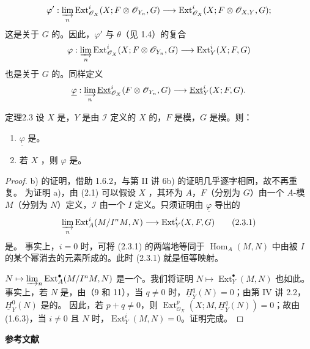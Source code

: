 \[
\varphi':\varinjlim_n\operatorname{Ext}^i_{\mathscr O_X}(X;F\otimes\mathscr O_{Y_n},G)
\longrightarrow\operatorname{Ext}^i_{\mathscr O_X}(X;F\otimes\mathscr O_{X,Y},G);
\]
这是关于 $G$ 的。因此，$\varphi'$ 与 $\theta$（见 1.4）的复合
\[
\varphi:\varinjlim_n\operatorname{Ext}^i_{\mathscr O_X}(X;F\otimes\mathscr O_{Y_n},G)
\longrightarrow\operatorname{Ext}^i_Y(X;F,G)
\]
也是关于 $G$ 的。同样定义
\[
\underline\varphi:\varinjlim_n\underline{\operatorname{Ext}}^i_{\mathscr O_X}(F\otimes\mathscr O_{Y_n},G)
\longrightarrow\underline{\operatorname{Ext}}^i_Y(X;F,G).
\]
\begin{SGAresult}{定理}{2.3}
设 $X$ 是，$Y$ 是由 $\mathscr I$ 定义的 $X$ 的，$F$ 是模，$G$ 是模。则：
\begin{enumerate}
\item[a)] $\underline\varphi$ 是。
\item[b)] 若 $X$ ，则 $\varphi$ 是。
\end{enumerate}
\end{SGAresult}
\begin{proof}
b) 的证明，借助 1.6.2，与第 II 讲 6b) 的证明几乎逐字相同，故不再重复。
为证明 a)，由 (2.1) 可以假设 $X$ ，其环为 $A$，$F$（分别为 $G$）由一个 $A$-模 $M$（分别为 $N$）定义，$\mathscr I$ 由一个 $I$ 定义。只须证明由 $\underline\varphi$ 导出的
\[
\varinjlim_n\operatorname{Ext}^i_A(M/I^nM,N)
\longrightarrow\operatorname{Ext}^i_Y(X,F,G)\tag{2.3.1}
\]
是。
事实上，$i=0$ 时，可将 (2.3.1) 的两端地等同于 $\operatorname{Hom}_A(M,N)$ 中由被 $I$ 的某个幂消去的元素所成的。此时 (2.3.1) 就是恒等映射。

 $N\mapsto\varinjlim_n\operatorname{Ext}^{\bullet}_A(M/I^nM,N)$ 是一个。我们将证明 $N\mapsto\operatorname{Ext}^{\bullet}_Y(M,N)$ 也如此。事实上，若 $N$ 是，由（9 和 11），当 $q\neq0$ 时，$\underline H^q_Y(N)=0$；由第 IV 讲 2.2，$\underline H^0_Y(N)$ 是的。
因此，若 $p+q\neq0$，则 $\operatorname{Ext}^p_{\mathscr O_X}(X;M,\underline H^q_Y(N))=0$；故由 (1.6.3)，当 $i\neq0$ 且 $N$ 时，$\operatorname{Ext}^i_Y(M,N)=0$。证明完成。
\end{proof}
\textbf{参考文献}

